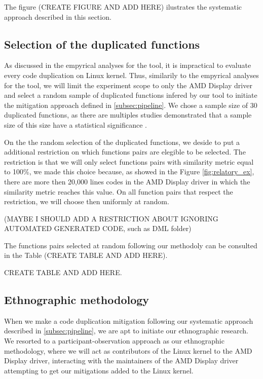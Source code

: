 The figure (CREATE FIGURE AND ADD HERE) ilustrates the systematic approach described in this section.

\subsection{Selection of the duplicated functions}

As discussed in the empyrical analyses for the tool, it is impractical to evaluate every code duplication on Linux kernel. Thus,
similarily to the empyrical analyses for the tool, we will limit the experiment scope to only the AMD Display driver and select
a random sample of duplicated functions infered by our tool to initiate the mitigation approach defined in \ref{subsec:pipeline}. 
We chose a sample size of 30 duplicated functions, as there are multiples studies demonstrated that a sample size of this size 
have a statistical significance \citep{sample1,sample2}.

On the the random selection of the duplicated functions, we deside to put a additional restriction on which functions pairs are 
elegible to be selected. The restriction is that we will only select functions pairs with similarity metric equal 
to 100\%, we made this choice because, as showed in the Figure \ref{fig:relatory_ex}, there are more then 20,000 lines codes 
in the AMD Display driver in which the similarity metric reaches this value. On all function pairs that respect the restriction,
we will choose then uniformly at random.

(MAYBE I SHOULD ADD A RESTRICTION ABOUT IGNORING AUTOMATED GENERATED CODE, such as DML folder)

The functions pairs selected at random following our methodoly can be consulted in the Table (CREATE TABLE AND ADD HERE).

CREATE TABLE AND ADD HERE.

\subsection{Ethnographic methodology}

When we make a code duplication mitigation following our systematic approach described in \ref{subsec:pipeline}, we are apt
to initiate our ethnographic research. We resorted to a participant-observation approach as our ethnographic methodology, where we 
will act as contributors of the Linux kernel to the AMD Display driver, interacting with the maintainers of the AMD Display driver
attempting to get our mitigations added to the Linux kernel. 

